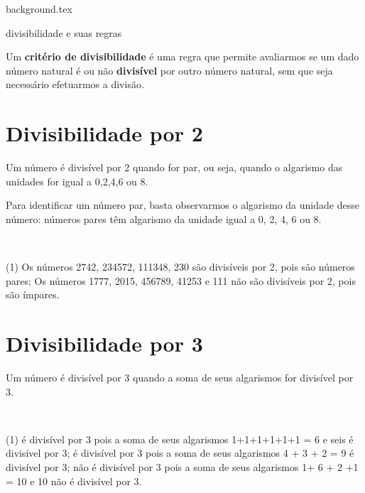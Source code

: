 \documentclass[10pt]{article}
\begin{document}
    {background.tex} %
        \begin{center}
            {\LARGE {\sc divisibilidade e suas regras}}
        \end{center}

\begin{definicao}
Um \textbf{critério de divisibilidade} é uma regra que permite avaliarmos se um dado número natural é ou não \textbf{divisível} por outro número natural, sem que seja necessário efetuarmos a divisão.
\end{definicao}

\section*{Divisibilidade por 2}
Um número é divisível por 2 quando for par, ou seja,
quando o algarismo das unidades for igual a 0,2,4,6 ou 8.
    \begin{obs}
        Para identificar um número par, basta observarmos o
        algarismo da unidade desse número: números pares têm
        algarismo da unidade igual a 0, 2, 4, 6 ou 8.
    \end{obs}

\begin{exemplo} ~\\
\begin{tasks}(1)
    \task Os números 2742, 234572, 111348, 230 são divisíveis por 2, pois são números pares;
    \task Os números 1777, 2015, 456789, 41253 e 111 não são divisíveis por 2, pois são ímpares.
\end{tasks}
    
\end{exemplo}

\section*{Divisibilidade por 3}
Um número é divisível por 3 quando a soma de seus algarismos for divisível por 3. 

\begin{exemplo}~\\

\begin{tasks}(1)
         é divisível por 3 pois a soma de seus algarismos 1+1+1+1+1+1 = 6 e seis é divisível por 3;
         é divisível por 3 pois a soma de seus algarismos 4 + 3 + 2 = 9 é divisível por 3;
         não é divisível por 3 pois a soma de seus algarismos 1+ 6 + 2 +1 = 10 e 10 não é divisível por 3.
    \end{tasks}
\end{exemplo}
\end{document}
